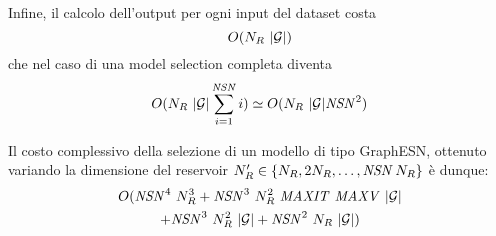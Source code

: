 Infine, il calcolo dell'output per ogni input del dataset costa
\begin{equation}
O(N_R\ \lvert\mathcal{G}\rvert)
\end{equation}
che nel caso di una model selection completa diventa
\begin{equation}
\displaystyle O(N_R\ \lvert\mathcal{G}\rvert \sum_{i=1}^{\mathit{NSN}} i) \\
\displaystyle \simeq O(N_R\ \lvert\mathcal{G}\rvert \mathit{NSN}^2) \\
\end{equation}

Il costo complessivo della selezione di un modello di tipo GraphESN, ottenuto variando la dimensione del reservoir $N_R' \in \lbrace N_R, 2N_R, \dots, \mathit{NSN}\, N_R \rbrace$ è dunque:
\begin{multline}
O(\mathit{NSN}^4\ N_R^3 + \mathit{NSN}^3\ N_R^2\ \mathit{MAXIT}\ \mathit{MAXV}\ \lvert\mathcal{G}\rvert \\
+ \mathit{NSN}^3\ N_R^2\ \lvert\mathcal{G}\rvert + \mathit{NSN}^2\ N_R\ \lvert\mathcal{G}\rvert) 
\end{multline}


\begin{comment}

--------------------------------------------------------------------------------

*** Calcolo dell'output (readout globale) ***

Differisce dal caso precedente solo perché ha in input unicamente gli 
output-feedback, quindi nessun reservoir.

    O(Ny^2 d^2 |G|)
    ~ O(d^2 |G|)


********************************************************************************
********************************************************************************

*** Confronto: Costruttivo VS Standard ***

** GraphESN Costruttiva

reservoir:          O(d |G| Nr^2 v j)
sub learning:       O(d^4 + Nr d^3 + Nr^2 d^2 + Nr^3 d + d^3 |G| + d^2 Nr |G| + d Nr^2 |G|) 
gloabl learning:    O(d^4 + d^3 |G|) 
sub output:         O(d Nr |G| + d^2 |G|) 
global output:      O(d^2 |G|) 

** GraphESN Stadard

[CLAUDIO]: specifica le assunzioni.
ne stai facendo almeno due importanti:
1. reservoir pienamente connessi
2. dimensione del reservoir in GraphESN standard = Nr x j

reservoir:          O(d |G| Nr^2 v j)
learning:           O(Nr^3 + Nr^2 |G|)
output:             O(|G| Nr)

[CLAUDIO]: quindi da qui fai vedere quando e' conveniente GraphESN-FOF rispetto a GraphESN standard.
\end{comment}